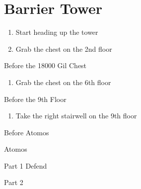 \chapter{Barrier Tower}

\vspace{\baselineskip}

\begin{paracol}{2}

\begin{enumerate}
    \item Start heading up the tower
    \item Grab the  chest on the 2nd floor
\end{enumerate}

\switchcolumn
\begin{steproute}{Before the 18000 Gil Chest}
\end{steproute}

\switchcolumn*
\begin{enumerate}[resume]
    \item Grab the  chest on the 6th floor
\end{enumerate}

\switchcolumn
\begin{steproute}{Before the 9th Floor}
\end{steproute}

\switchcolumn*
\begin{enumerate}[resume]
    \item Take the right stairwell on the 9th floor
\end{enumerate}

\switchcolumn
\begin{steproute}{Before Atomos}
\end{steproute}

\switchcolumn
\begin{boss}{Atomos}
	\varwb
	\begin{bossPart}{Part 1}
		 Defend
        \bartz \leftCommand{\drink} \then \heroDrink
        \bartz \leftCommand{\drink} \then \speedDrink
        \bartz \leftCommand{\drink} \then \heroDrink
        \bartz \leftCommand{\drink} \then \heroDrink
	\end{bossPart}
    \begin{bossPart}{Part 2}
        \bartz[\bossHl{(4x)}] \rightCommand{\gilToss}
        \item {}
        \vspace{1mm}
        \item[] 
	\end{bossPart}
	\varwe
\end{boss}


\end{paracol}
